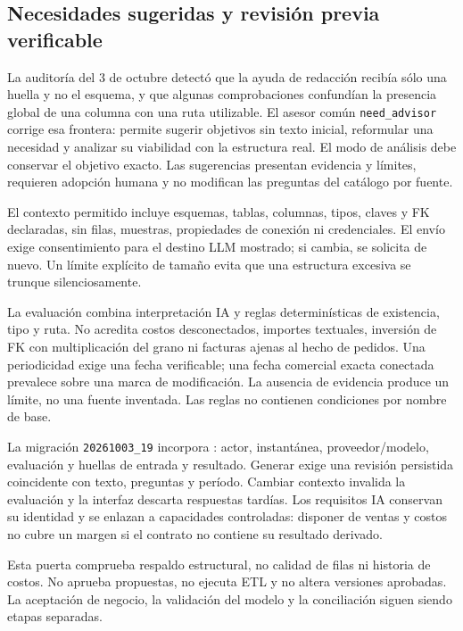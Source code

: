 \documentclass[11pt,letterpaper]{article}
\newcommand{\file}[1]{\texttt{#1}}
\begin{document}
\subsection{Necesidades sugeridas y revisión previa verificable}

La auditoría del 3 de octubre detectó que la ayuda de redacción recibía sólo una huella
y no el esquema, y que algunas comprobaciones confundían la presencia global de una
columna con una ruta utilizable. El asesor común \file{need\_advisor} corrige esa frontera:
permite sugerir objetivos sin texto inicial, reformular una necesidad y analizar su
viabilidad con la estructura real. El modo de análisis debe conservar el objetivo
exacto. Las sugerencias presentan evidencia y límites, requieren adopción humana y
no modifican las preguntas del catálogo por fuente.

El contexto permitido incluye esquemas, tablas, columnas, tipos, claves y FK declaradas,
sin filas, muestras, propiedades de conexión ni credenciales. El envío exige
consentimiento para el destino LLM mostrado; si cambia, se solicita de nuevo. Un límite
explícito de tamaño evita que una estructura excesiva se trunque silenciosamente.

La evaluación combina interpretación IA y reglas determinísticas de existencia,
tipo y ruta. No acredita costos desconectados, importes textuales, inversión de FK
con multiplicación del grano ni facturas ajenas al hecho de pedidos. Una periodicidad
exige una fecha verificable; una fecha comercial exacta conectada prevalece sobre una
marca de modificación. La ausencia de evidencia produce un límite, no una fuente
inventada. Las reglas no contienen condiciones por nombre de base.

La migración \file{20261003\_19} incorpora : actor,
instantánea, proveedor/modelo, evaluación y huellas de entrada y resultado. Generar
exige una revisión persistida coincidente con texto, preguntas y período. Cambiar
contexto invalida la evaluación y la interfaz descarta respuestas tardías. Los
requisitos IA conservan su identidad y se enlazan a capacidades controladas: disponer
de ventas y costos no cubre un margen si el contrato no contiene su resultado derivado.

Esta puerta comprueba respaldo estructural, no calidad de filas ni historia de costos.
No aprueba propuestas, no ejecuta ETL y no altera versiones aprobadas. La aceptación
de negocio, la validación del modelo y la conciliación siguen siendo etapas separadas.
\end{document}
